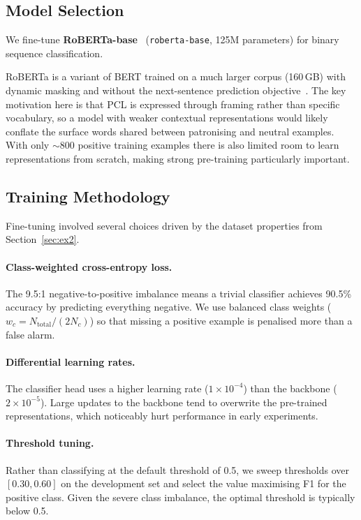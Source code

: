 \documentclass[11pt,a4paper]{article}
\begin{document}
\subsection{Model Selection}

We fine-tune \textbf{RoBERTa-base}~\cite{liu2019roberta} (\texttt{roberta-base}, 125M parameters) for binary sequence classification.

RoBERTa is a variant of BERT trained on a much larger corpus (160\,GB) with dynamic masking and without the next-sentence prediction objective~\cite{liu2019roberta}. The key motivation here is that PCL is expressed through framing rather than specific vocabulary, so a model with weaker contextual representations would likely conflate the surface words shared between patronising and neutral examples. With only ${\sim}800$ positive training examples there is also limited room to learn representations from scratch, making strong pre-training particularly important.

\subsection{Training Methodology}

Fine-tuning involved several choices driven by the dataset properties from Section~\ref{sec:ex2}.

\paragraph{Class-weighted cross-entropy loss.} The 9.5:1 negative-to-positive imbalance means a trivial classifier achieves 90.5\% accuracy by predicting everything negative. We use balanced class weights ($w_c = N_{\text{total}} / (2 N_c)$) so that missing a positive example is penalised more than a false alarm.

\paragraph{Differential learning rates.} The classifier head uses a higher learning rate ($1 \times 10^{-4}$) than the backbone ($2 \times 10^{-5}$). Large updates to the backbone tend to overwrite the pre-trained representations, which noticeably hurt performance in early experiments.

\paragraph{Threshold tuning.}
Rather than classifying at the default threshold of 0.5, we sweep thresholds over $[0.30, 0.60]$ on the development set and select the value maximising F1 for the positive class. Given the severe class imbalance, the optimal threshold is typically below 0.5.
\end{document}
